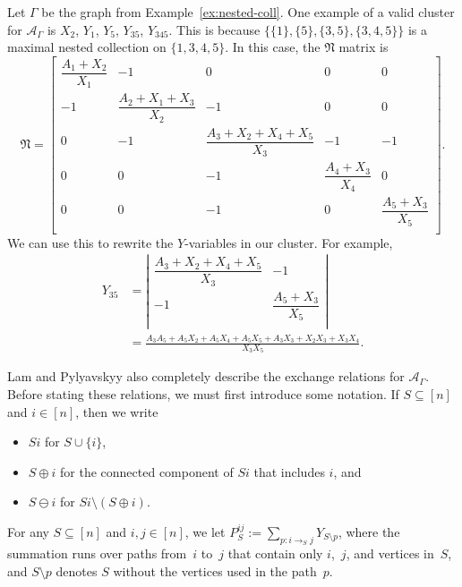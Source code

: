 \documentclass[10pt,a4paper]{amsart}
\numberwithin{equation}{section}
\begin{document}
\begin{Example}\label{ex:graph-LP}
Let $\Gamma$ be the graph from Example~\ref{ex:nested-coll}. One example of a valid cluster for $\mathcal{A}_\Gamma$ is $X_2$, $Y_1$, $Y_5$, $Y_{35}$, $Y_{345}$. This is because $\{\{1\}, \{5\}, \{3,5\}, \{3,4,5\}\}$ is a maximal nested collection on $\{1,3,4,5\}$. In this case, the $\mathfrak{N}$ matrix is
\[
\mathfrak{N}=
\begin{bmatrix}
\dfrac{A_1+X_2}{X_1} & -1 & 0 & 0 & 0 \\
-1 & \dfrac{A_2+X_1+X_3}{X_2} & -1 & 0 & 0 \\
0 & -1 & \dfrac{A_3+X_2+X_4+X_5}{X_3} & -1 & -1 \\
0 & 0 & -1 & \dfrac{A_4+X_3}{X_4} & 0 \\
0 & 0 & -1 & 0 & \dfrac{A_5+X_3}{X_5} \\
\end{bmatrix}.
\]
We can use this to rewrite the $Y$-variables in our cluster. For example,
\begin{align*}
Y_{35}& =\left|
\begin{matrix}
\dfrac{A_3+X_2+X_4+X_5}{X_3} & -1 \\
-1 & \dfrac{A_5+X_3}{X_5} \\
\end{matrix}
\right|\\
& =\frac{A_3A_5+A_5X_2+A_5X_4+A_5X_5+A_3X_3+X_2X_3+X_3X_4}{X_3X_5}.
\end{align*}
\end{Example}
Lam and Pylyavskyy also completely describe the exchange relations for $\mathcal{A}_\Gamma$. Before stating these relations, we must first introduce some notation. If $S\subseteq[n]$ and $i\in[n]$, then we write
\begin{itemize}\itemsep=0pt
 \item $Si$ for $S\cup\{i\}$,
 \item $S\oplus i$ for the connected component of $Si$ that includes $i$, and
 \item $S\ominus i$ for $Si\setminus(S\oplus i)$.
\end{itemize}
For any $S\subseteq[n]$ and $i,j\in[n]$, we let $P_S^{ij} :=\sum_{p:i\to_S j}Y_{S\setminus p}$, where the summation runs over paths from~$i$ to~$j$ that contain only $i$,~$j$, and vertices in~$S$, and $S\setminus p$ denotes $S$ without the vertices used in the path~$p$.
\end{document}
